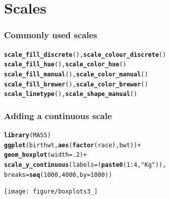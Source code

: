 \documentclass{beamer}\usepackage{graphicx, color}
\makeatletter
\newcommand{\hlfunctioncall}[1]{\textcolor[rgb]{0.501960784313725,0,0.329411764705882}{\textbf{#1}}}%
\newcommand{\hlstring}[1]{\textcolor[rgb]{0.6,0.6,1}{#1}}%
\newenvironment{kframe}{%
 \def\at@end@of@kframe{}%
 \ifinner\ifhmode%
  \def\at@end@of@kframe{\end{minipage}}%
  \begin{minipage}{\columnwidth}%
 \fi\fi%
 \def\FrameCommand##1{\hskip\@totalleftmargin \hskip-\fboxsep
 \colorbox{shadecolor}{##1}\hskip-\fboxsep
     \hskip-\linewidth \hskip-\@totalleftmargin \hskip\columnwidth}%
 \MakeFramed {\advance\hsize-\width
   \@totalleftmargin\z@ \linewidth\hsize
   \@setminipage}}%
 {\par\unskip\endMakeFramed%
 \at@end@of@kframe}
\newenvironment{knitrout}{}{} %
\makeatother
\begin{document}
\section*{Scales}
\frame{\sectionpage}

\begin{frame}[fragile]
\frametitle{Commonly used scales}
\begin{knitrout}\footnotesize
{}\color{fgcolor}\begin{kframe}
\begin{alltt}
\hlfunctioncall{scale_fill_discrete}(), \hlfunctioncall{scale_colour_discrete}()
\hlfunctioncall{scale_fill_hue}(), \hlfunctioncall{scale_color_hue}()
\hlfunctioncall{scale_fill_manual}(),  \hlfunctioncall{scale_color_manual}()
\hlfunctioncall{scale_fill_brewer}(), \hlfunctioncall{scale_color_brewer}()
\hlfunctioncall{scale_linetype}(), \hlfunctioncall{scale_shape_manual}()
\end{alltt}
\end{kframe}
\end{knitrout}

\end{frame}

\begin{frame}[fragile]
\frametitle{Adding a continuous scale}
\begin{knitrout}\footnotesize
{}\color{fgcolor}\begin{kframe}
\begin{alltt}
\hlfunctioncall{library}(MASS)
\hlfunctioncall{ggplot}(birthwt, \hlfunctioncall{aes}(\hlfunctioncall{factor}(race), bwt)) +
\hlfunctioncall{geom_boxplot}(width = .2) +
\hlfunctioncall{scale_y_continuous}(labels = (\hlfunctioncall{paste0}(1:4, \hlstring{" Kg"})),
breaks = \hlfunctioncall{seq}(1000, 4000, by = 1000))
\end{alltt}
\end{kframe}
\texttt{[image: figure/boxplots3\_]} 

\end{knitrout}

\end{frame}
\end{document}
